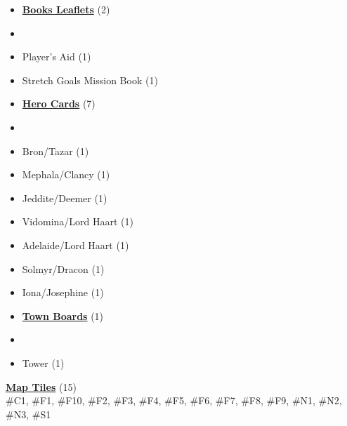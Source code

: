 
\begin{multicols}{3}

\footnotesize

\begin{itemize}[leftmargin=0pt, label={}, noitemsep]
  \item \textbf{\small{\underline{Books Leaflets}}} (2)
  \item
  \item Player's Aid (1)
  \item Stretch Goals Mission Book (1)
\end{itemize}

\begin{itemize}[leftmargin=0pt, label={}, noitemsep]
  \item \textbf{\small{\underline{Hero Cards}}} (7)
  \item
  \item Bron/Tazar (1)
  \item Mephala/Clancy (1)
  \item Jeddite/Deemer (1)
  \item Vidomina/Lord Haart (1)
  \item Adelaide/Lord Haart (1)
  \item Solmyr/Dracon (1)
  \item Iona/Josephine (1)
\end{itemize}

\begin{itemize}[leftmargin=0pt, label={}, noitemsep]
  \item \textbf{\small{\underline{Town Boards}}} (1)
  \item
  \item Tower (1)
\end{itemize}

\textbf{\small{\underline{Map Tiles}}} (15)\\

\#C1, \#F1, \#F10, \#F2, \#F3, \#F4, \#F5, \#F6, \#F7, \#F8, \#F9, \#N1, \#N2, \#N3, \#S1


\end{multicols}
